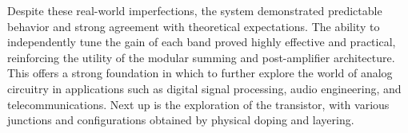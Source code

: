 \documentclass[12pt]{article}
\begin{document}
Despite these real-world imperfections, the system demonstrated predictable behavior and strong agreement with theoretical expectations. The ability to independently tune the gain of each band proved highly effective and practical, reinforcing the utility of the modular summing and post-amplifier architecture. This offers a strong foundation in which to further explore the world of analog circuitry in applications such as digital signal processing, audio engineering, and telecommunications. Next up is the exploration of the transistor, with various junctions and configurations obtained by physical doping and layering.
\end{document}
